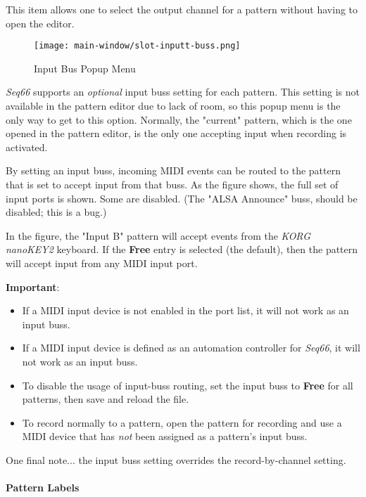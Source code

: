    This item allows one to select the output channel for a pattern without
   having to open the editor.

\begin{figure}[H]
   \centering 
   \texttt{[image: main-window/slot-inputt-buss.png]}
   \caption{Input Bus Popup Menu}
   \label{fig:slot_input_bus}
\end{figure}

   \textsl{Seq66} supports an
   \textsl{optional} input buss setting for each pattern.
   This setting is not available in the pattern editor due to lack
   of room, so this popup menu is the only way to get to this option.
   Normally, the "current" pattern, which is the one opened in
   the pattern editor, is the only one accepting input when
   recording is activated.

   By setting an input buss, incoming MIDI events can be routed to
   the pattern that is set to accept input from that buss.
   As the figure shows, the full set of input ports is shown.
   Some are disabled. (The "ALSA Announce" buss, should be disabled; this
   is a bug.)

   In the figure, the "Input B" pattern will accept events from
   the \textsl{KORG nanoKEY2} keyboard.
   If the \textbf{Free} entry is selected (the default), then
   the pattern will accept input from any MIDI input port.

   \textbf{Important}:
   \begin{itemize}
      \item If a MIDI input device is not enabled in the port list,
         it will not work as an input buss.
      \item If a MIDI input device is defined as an automation controller for
         \textsl{Seq66}, it will not work as an input buss.
      \item To disable the usage of input-buss routing, set the input buss
         to \textbf{Free} for all patterns, then save and reload the file.
      \item To record normally to a pattern, open the pattern for recording
         and use a MIDI device that has \textsl{not} been assigned as
         a pattern's input buss.
   \end{itemize}

   One final note... the input buss setting overrides the record-by-channel
   setting.

\paragraph{Pattern Labels}
\label{paragraph:patterns_labels}
   

